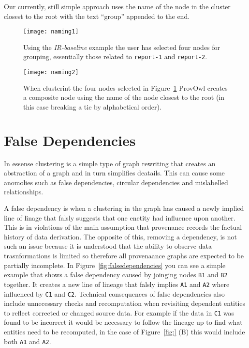 Our currently, still simple approach uses the name of the node in the cluster closest to the root with the text ``group'' appended to the end.

\begin{figure}[h]
	\centering
	\texttt{[image: naming1]}
	\caption{Using the \textit{IR-baseline} example the user has selected four nodes for grouping, essentially those related to \texttt{report-1} and \texttt{report-2}.}
	\label{fig:naming1}
\end{figure}
\begin{figure}[h]
	\centering
	\texttt{[image: naming2]}
	\caption{When clusterint the four nodes selected in Figure~\ref{fig:naming1} ProvOwl creates a composite node using the name of the node closest to the root (in this case breaking a tie by alphabetical order).}
	\label{fig:naming2}
\end{figure}
\clearpage

\section{False Dependencies}
\label{sec:section_name}

In essense clustering is a simple type of graph rewriting that creates an abstraction of a graph and in turn simplifies deatails. This can cause some anomolies such as false dependencies, circular dependencies and mislabelled relationships. 

A false dependency is when a clustering in the graph has caused a newly implied line of linage that falsly suggests that one enetity had influence upon another. This is in violations of the main assumption that provenance records the factual history of data derivation. The opposite of this, removing a dependency, is not such an issue because it is understood that the ability to observe data trasnformations is limited so therefore all provenaance graphs are expected to be partially incomplete. In Figure~\ref{fig:falsedependencies} you can see a simple example that shows a false dependency caused by joinging nodes \texttt{B1} and \texttt{B2} together. It creates a new line of lineage that falsly implies \texttt{A1} and \texttt{A2} where influenced by \texttt{C1} and \texttt{C2}. Technical consequences of false dependencies also include unnecessary checks and recomputation when revisiting dependent entities to reflect corrected or changed source data. For example if the data in \texttt{C1} was found to be incorrect it would be necessary to follow the lineage up to find what entities need to be recomputed, in the case of Figure~\ref{fig:} (B) this would include both \texttt{A1} and \texttt{A2}.

